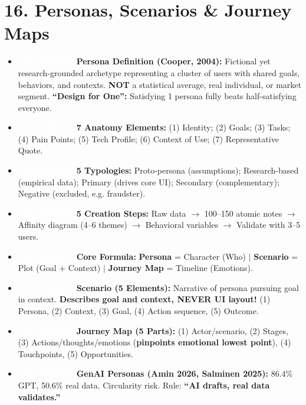 \documentclass[8.5pt,a4paper,twocolumn]{article}
\newcommand{\tagmem}{\colorbox{accentred}{\textcolor{white}{\bfseries\fontsize{5.5pt}{6.5pt}\selectfont MEMORIZE}}\ }
\begin{document}
\section*{16. Personas, Scenarios \& Journey Maps}
\begin{itemize}[leftmargin=7pt, itemsep=1pt, topsep=0.5pt]
    \item \tagmem \textbf{Persona Definition (Cooper, 2004):} Fictional yet research-grounded archetype representing a cluster of users with shared goals, behaviors, and contexts. \textbf{NOT} a statistical average, real individual, or market segment. \textbf{``Design for One'':} Satisfying 1 persona fully beats half-satisfying everyone.
    \item \tagmem \textbf{7 Anatomy Elements:} (1) Identity; (2) Goals; (3) Tasks; (4) Pain Points; (5) Tech Profile; (6) Context of Use; (7) Representative Quote.
    \item \tagmem \textbf{5 Typologies:} Proto-persona (assumptions); Research-based (empirical data); Primary (drives core UI); Secondary (complementary); Negative (excluded, e.g. fraudster).
    \item \tagmem \textbf{5 Creation Steps:} Raw data $\to$ 100--150 atomic notes $\to$ Affinity diagram (4--6 themes) $\to$ Behavioral variables $\to$ Validate with 3--5 users.
    \item \tagmem \textbf{Core Formula:} \textbf{Persona} = Character (Who) $\vert$ \textbf{Scenario} = Plot (Goal + Context) $\vert$ \textbf{Journey Map} = Timeline (Emotions).
    \item \tagmem \textbf{Scenario (5 Elements):} Narrative of persona pursuing goal in context. \textbf{Describes goal and context, NEVER UI layout!} (1) Persona, (2) Context, (3) Goal, (4) Action sequence, (5) Outcome.
    \item \tagmem \textbf{Journey Map (5 Parts):} (1) Actor/scenario, (2) Stages, (3) Actions/thoughts/emotions (\textbf{pinpoints emotional lowest point}), (4) Touchpoints, (5) Opportunities.
    \item \tagmem \textbf{GenAI Personas (Amin 2026, Salminen 2025):} 86.4\% GPT, 50.6\% real data. Circularity risk. Rule: \textbf{``AI drafts, real data validates.''}
\end{itemize}
\end{document}
